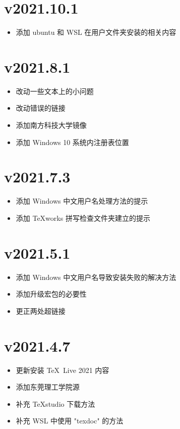 \section*{v2021.10.1}

\begin{itemize}
  \item 添加 ubuntu 和 WSL 在用户文件夹安装的相关内容
\end{itemize}

\section*{v2021.8.1}

\begin{itemize}
  \item 改动一些文本上的小问题
  \item 改动错误的链接
  \item 添加南方科技大学镜像
  \item 添加 Windows 10 系统内注册表位置
\end{itemize}

\section*{v2021.7.3}

\begin{itemize}
  \item 添加 Windows 中文用户名处理方法的提示
  \item 添加 \TeX works 拼写检查文件夹建立的提示
\end{itemize}

\section*{v2021.5.1}

\begin{itemize}
  \item 添加 Windows 中文用户名导致安装失败的解决方法
  \item 添加升级宏包的必要性
  \item 更正两处超链接
\end{itemize}

\section*{v2021.4.7}

\begin{itemize}
  \item 更新安装 \TeX~Live 2021 内容
  \item 添加东莞理工学院源
  \item 补充 \TeX studio 下载方法
  \item 补充 WSL 中使用 "texdoc" 的方法
\end{itemize}

